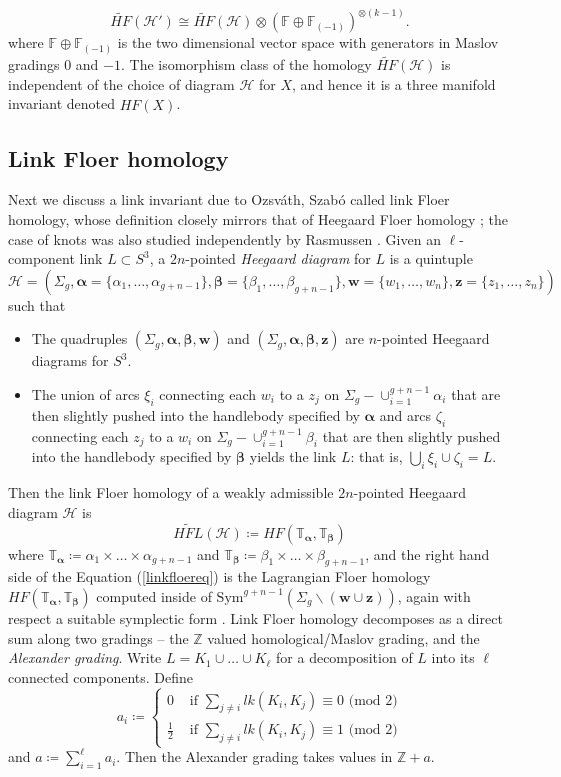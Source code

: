\documentclass[11pt]{amsart}
\theoremstyle{definition}
\theoremstyle{remark}
\def\F{\mathbb{F}}
\def\Z{\mathbb{Z}}
\def\talpha{\mathbb{T}_{\bm{\alpha}}}
\def\tbeta{\mathbb{T}_{\bm{\beta}}}
\def\Sym{\mathrm{Sym}}
\def\HF {\mathit{HF}}
\newcommand\HFhat{\widehat{\HF}}
\numberwithin{equation}{section}
\begin{document}
\begin{equation}
    \widetilde{HF}(\mathcal{H}')\cong\widetilde{HF}(\mathcal{H})\otimes (\F\oplus\F_{(-1)})^{\otimes (k-1)}.
\end{equation}
where $\F\oplus\F_{(-1)}$ is the two dimensional vector space with generators in Maslov gradings $0$ and $-1.$ The isomorphism class of the homology $\widetilde{HF}(\mathcal{H})$ is independent of the choice of diagram $\mathcal{H}$ for $X$, and hence it is a three manifold invariant denoted $\HFhat(X)$.
\subsection{Link Floer homology}\label{link}
Next we discuss a link invariant due to Ozsv\'{a}th, Szab\'{o} called link Floer homology, whose definition closely mirrors that of Heegaard Floer homology \cite{OSSlink}; the case of knots was also studied independently by Rasmussen \cite{RasmussenThesis}. Given an $\ell$-component link $L\subset S^3$, a $2n$-pointed \emph{Heegaard diagram} for $L$ is a quintuple \[\mathcal{H}=(\Sigma_g, \bm{\alpha}=\{\alpha_1,\hdots,\alpha_{g+n-1}\},\bm{\beta}=\{\beta_1,\hdots,\beta_{g+n-1}\},\bm{w}=\{w_1,\hdots,w_n\},\bm{z}=\{z_1,\hdots,z_n\})\]
such that 
\begin{itemize}
\item The quadruples $(\Sigma_g,\bm{\alpha},\bm{\beta},\bm{w})$ and $(\Sigma_g,\bm{\alpha},\bm{\beta},\bm{z})$ are $n$-pointed Heegaard diagrams for $S^3$.
\item The union of arcs $\xi_i$ connecting each $w_i$ to a $z_j$ on $\Sigma_g-\cup_{i=1}^{g+n-1}\alpha_i$ that are then slightly pushed into the handlebody specified by $\bm{\alpha}$ and arcs $\zeta_i$ connecting each $z_j$ to a $w_i$ on $\Sigma_g-\cup_{i=1}^{g+n-1}\beta_i$ that are then slightly pushed into the handlebody specified by $\bm{\beta}$ yields the link $L$: that is, $\bigcup_i \xi_i\cup \zeta_i=L$.
\end{itemize}
Then the link Floer homology of a weakly admissible $2n$-pointed Heegaard diagram $\mathcal{H}$ is
\begin{equation}\label{linkfloereq}
\widetilde{HFL}(\mathcal{H})\coloneq HF(\talpha,\tbeta)
\end{equation}
where $\talpha\coloneq \alpha_1\times\hdots\times\alpha_{g+n-1}$ and $\tbeta\coloneq \beta_1\times\hdots\times \beta_{g+n-1}$, and the right hand side of the Equation (\ref{linkfloereq}) is the Lagrangian Floer homology $HF(\talpha,\tbeta)$ computed inside of $\Sym^{g+n-1}(\Sigma_g\backslash (\bm{w}\cup\bm{z}))$, again with respect a suitable symplectic form \cite{perutz}. Link Floer homology decomposes as a direct sum along two gradings -- the $\Z$ valued homological/Maslov grading, and the \emph{Alexander grading}.  Write $L=K_1\cup\hdots\cup K_\ell$ for a decomposition of $L$ into its $\ell$ connected components. Define \[a_i\coloneq \begin{cases}
    0&\textrm{ if }\sum_{j\neq i}lk(K_i,K_j)\equiv 0\textrm{ (mod }2\textrm{)}\\
    \frac{1}{2}&\textrm{ if }\sum_{j\neq i}lk(K_i,K_j)\equiv 1\textrm{ (mod }2\textrm{)}
\end{cases}\] and $a\coloneq \sum_{i=1}^\ell a_i.$ Then the Alexander grading takes values in $\Z+a$.
\end{document}

